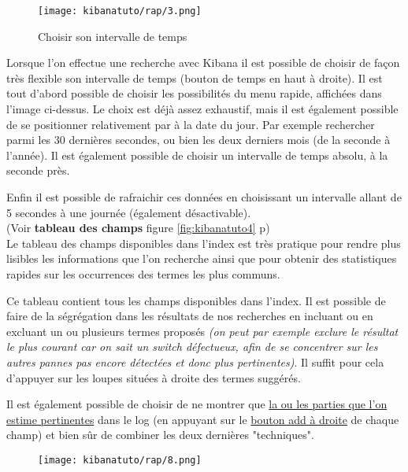\begin{figure}[H]
\center
\texttt{[image: kibanatuto/rap/3.png]}
\label{fig:kibanatuto3}
\caption{Choisir son intervalle de temps}
\end{figure}
Lorsque l'on effectue une recherche avec Kibana il est possible de choisir de façon
très flexible son intervalle de temps (bouton de temps en haut à droite).
Il est tout d'abord possible de choisir les possibilités du menu rapide, affichées
dans l'image ci-dessus. Le choix est déjà assez exhaustif, mais il est également 
possible de se positionner relativement par à la date du jour. Par exemple rechercher 
parmi les 30 dernières secondes, ou bien les deux derniers mois (de la seconde à 
l'année). Il est également possible de choisir un intervalle de temps absolu, à 
la seconde près.

Enfin il est possible de rafraichir ces données en choisissant un intervalle allant
de 5 secondes à une journée (également désactivable).\\[2mm]
(Voir \textbf{tableau des champs} figure \ref{fig:kibanatuto4} p\pageref{fig:kibanatuto4})\\[2mm]

Le tableau des champs disponibles dans l'index est très pratique pour rendre plus 
lisibles les informations que l'on recherche ainsi que pour obtenir des statistiques 
rapides sur les occurrences des termes les plus communs.

Ce tableau contient tous les champs disponibles dans l'index. Il est possible de
faire de la ségrégation dans les résultats de nos recherches en incluant ou en   
excluant un ou plusieurs termes proposés {\footnotesize\textit{(on peut par exemple exclure le résultat 
le plus courant car on sait un switch défectueux, afin de se concentrer sur les autres
pannes pas encore détectées et donc plus pertinentes)}}. Il suffit pour cela d'appuyer
sur les loupes situées à droite des termes suggérés.


Il est également possible de choisir de ne montrer que \hyperref[fig:kibanatuto6]{la ou les parties que l'on 
estime pertinentes} dans le log (en appuyant sur le \hyperref[fig:kibanatuto5]{bouton 
add à droite} de chaque champ) et bien sûr de combiner les deux dernières "techniques".
\begin{figure}[H]
\begin{flushright}
\texttt{[image: kibanatuto/rap/8.png]}
\label{fig:kibanatuto5}
\end{flushright}%
\end{figure}

